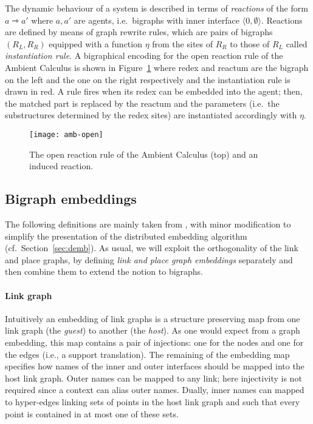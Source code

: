 \documentclass[a4paper,english,10pt]{article}
\theoremstyle{plain}\newtheorem{theorem}{Theorem}
\theoremstyle{plain}\newtheorem{corollary}[theorem]{Corollary}
\theoremstyle{plain}\newtheorem{proposition}[theorem]{Proposition}
\theoremstyle{plain}\newtheorem{lemma}[theorem]{Lemma}
\theoremstyle{plain}\newtheorem{definition}{Definition}
\theoremstyle{plain}\newtheorem{remark}{Remark}
\theoremstyle{plain}\newtheorem{example}[remark]{Example}
\newcommand{\?}[1]{}
\newcommand{\face}[1]{\langle #1 \rangle}
\begin{document}
The dynamic behaviour of a system is described in terms of
\emph{reactions} of the form $a \rightarrowtriangle a'$ where $a,a'$
are agents, i.e.~bigraphs with inner interface $\face{0,\emptyset}$.
Reactions are defined by means of graph rewrite rules, which are pairs
of bigraphs $(R_L, R_R)$ equipped with a function $\eta$ from the 
sites of $R_R$ to those of $R_L$ called \emph{instantiation rule}.
A bigraphical encoding for the open reaction rule of the Ambient 
Calculus is shown in Figure~\ref{fig:amb-open} where redex and 
reactum are the bigraph on the left and the one on the right respectively
and the instantiation rule is drawn in red. A rule fires when its redex 
can be embedded into the agent; then, the matched part is replaced by 
the reactum and the parameters (i.e.~the substructures determined by 
the redex sites) are instantiated accordingly with $\eta$.

\begin{figure}[t]
  \centering
  \texttt{[image: amb-open]}
  \caption{The open reaction rule of the Ambient Calculus (top)
  and an induced reaction.}
  \label{fig:amb-open}
\end{figure}


\subsection{Bigraph embeddings}
\label{sec:emb}
The following definitions are mainly taken from \cite{hoesgaard:thesis},
with minor modification to simplify the presentation of the 
distributed embedding algorithm (cf.~Section~\ref{sec:demb}).
As usual, we will exploit the orthogonality of the link and place graphs, 
by defining \emph{link and place graph embeddings} separately and then 
combine them to extend the notion to bigraphs. 

\vspace{-0.5ex}

\paragraph{Link graph}
Intuitively an embedding of link graphs is a structure preserving map
from one link graph (the \emph{guest}) to another (the \emph{host}). 
As one would expect from a graph 
embedding, this map contains a pair of injections: one for the nodes
and one for the edges (i.e., a support translation). The remaining
of the embedding map specifies how names of the inner and outer 
interfaces should be mapped into the host link graph. Outer names can
be mapped to any link; here injectivity is not required since a 
context can alias outer names. Dually, inner names can mapped to 
hyper-edges linking sets of points in the host link graph and such 
that every point is contained in at most one of these sets.
\end{document}
